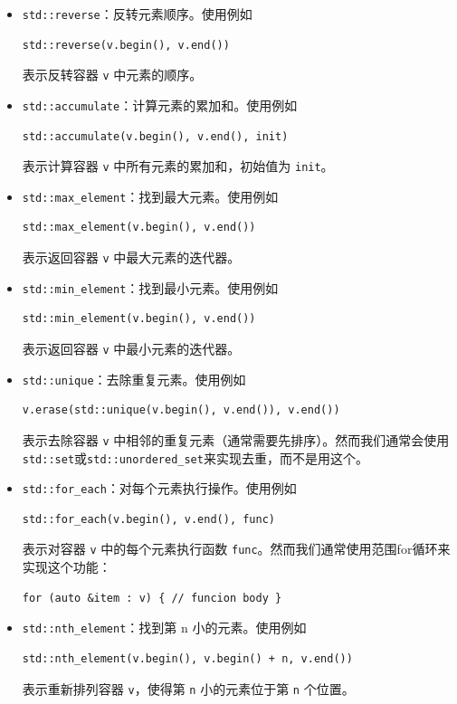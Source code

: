 \documentclass{article}
\begin{document}
\begin{itemize}
  \item \texttt{std::reverse}：反转元素顺序。使用例如
    \begin{lstlisting}
std::reverse(v.begin(), v.end())
    \end{lstlisting}
    表示反转容器 \texttt{v} 中元素的顺序。

  \item \texttt{std::accumulate}：计算元素的累加和。使用例如
    \begin{lstlisting}
std::accumulate(v.begin(), v.end(), init)
    \end{lstlisting}
    表示计算容器 \texttt{v} 中所有元素的累加和，初始值为 \texttt{init}。

  \item \texttt{std::max\_element}：找到最大元素。使用例如
    \begin{lstlisting}
std::max_element(v.begin(), v.end())
    \end{lstlisting}
    表示返回容器 \texttt{v} 中最大元素的迭代器。

  \item \texttt{std::min\_element}：找到最小元素。使用例如
    \begin{lstlisting}
std::min_element(v.begin(), v.end())
    \end{lstlisting}
    表示返回容器 \texttt{v} 中最小元素的迭代器。

  \item \texttt{std::unique}：去除重复元素。使用例如
    \begin{lstlisting}
v.erase(std::unique(v.begin(), v.end()), v.end())
    \end{lstlisting}
    表示去除容器 \texttt{v} 中相邻的重复元素（通常需要先排序）。然而我们通常会使用\texttt{std::set}或\texttt{std::unordered\_set}来实现去重，而不是用这个。

  \item \texttt{std::for\_each}：对每个元素执行操作。使用例如
    \begin{lstlisting}
std::for_each(v.begin(), v.end(), func)
    \end{lstlisting}
    表示对容器 \texttt{v} 中的每个元素执行函数 \texttt{func}。然而我们通常使用范围for循环来实现这个功能：
    \begin{lstlisting}
for (auto &item : v) { // funcion body }
    \end{lstlisting}

  \item \texttt{std::nth\_element}：找到第 n 小的元素。使用例如
    \begin{lstlisting}
std::nth_element(v.begin(), v.begin() + n, v.end())
    \end{lstlisting}
    表示重新排列容器 \texttt{v}，使得第 \texttt{n} 小的元素位于第 \texttt{n} 个位置。


\end{itemize}
\end{document}

